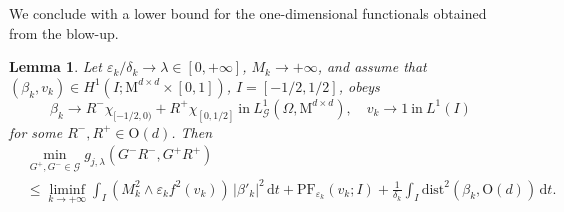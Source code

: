 \documentclass[a4paper,reqno]{amsart}
\newcommand\LG{{L}^1_\G}
\newcommand\dist{{\mathrm{dist}}}
\newcommand\dt{{\,\mathrm{d}t}}
\newtheorem{lemma}[definition]{Lemma}
\theoremstyle{remark}
\def\e{\varepsilon}
\newcommand{\G}{\mathcal{G}}
\newcommand{\On}{\mathrm{O}(d)}
\newcommand{\Mno}{\mathrm{M}^{d\times d}}
\numberwithin{equation}{section}
\begin{document}
We conclude with a lower bound for the one-dimensional functionals obtained from the blow-up.

\begin{lemma}\label{l:lb1d}
	Let 
	$\e_k/\delta_k \to \lambda\in [0,+\infty]$,
	$M_k\to +\infty$,
	and assume that $(\beta_k,v_k)\in H^1(I;\Mno \times [0,1])$, $I=[-1/2,1/2]$, obeys
	\[
	\beta_k \to  R^-\chi_{[-1/2,0)}+R^+\chi_{[0,1/2]}\ \text{in} \ \LG(\Omega,\Mno), \quad 
	v_k \to 1 \ \text{in} \ L^1(I)
	\]
	for some $ R^-,R^+\in\On$.
	 Then
	\begin{equation*}\label{eq-lb-1d}\begin{split}
&\min_{G^+,G^-\in\G}
g_{j,\lambda}(G^-R^-,G^+R^+)\\
&\le
 \liminf_{k\to +\infty}
\int_{{I} } ( M^2_k\wedge {\e_k}f^2(v_k) )\,|\beta'_k|^2 \dt + \mathrm{PF}_{\e_k}(v_k;I) +
\frac{1}{\delta_k} \int_{{I} }\dist^2(\beta_k, \On)  \dt .
\end{split}\end{equation*}
\end{lemma}
\end{document}
